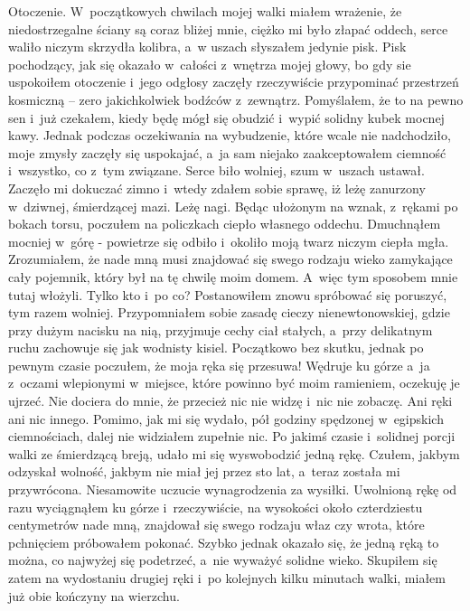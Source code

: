 Otoczenie. W~początkowych chwilach mojej walki miałem wrażenie, że niedostrzegalne ściany są coraz bliżej mnie, 
ciężko mi było złapać oddech, serce waliło niczym skrzydła kolibra, a~w uszach słyszałem jedynie pisk. Pisk 
pochodzący, jak się okazało w~całości z~wnętrza mojej głowy, bo gdy sie uspokoiłem otoczenie i~jego odgłosy zaczęły 
rzeczywiście przypominać przestrzeń kosmiczną -- zero jakichkolwiek bodźców z~zewnątrz. Pomyślałem, że to na pewno 
sen i~już czekałem, kiedy będę mógł się obudzić i~wypić solidny kubek mocnej kawy. Jednak podczas oczekiwania na 
wybudzenie, które wcale nie nadchodziło, moje zmysły zaczęły się uspokajać, a~ja sam niejako zaakceptowałem ciemność 
i~wszystko, co z~tym związane. Serce biło wolniej, szum w~uszach ustawał. Zaczęło mi dokuczać zimno i~wtedy zdałem 
sobie sprawę, iż leżę zanurzony w~dziwnej, śmierdzącej mazi. Leżę nagi. Będąc ułożonym na wznak, z~rękami po bokach 
torsu, poczułem na policzkach ciepło własnego oddechu. Dmuchnąłem mocniej w~górę - powietrze się odbiło i~okoliło 
moją twarz niczym ciepła mgła. Zrozumiałem, że nade mną musi znajdować się swego rodzaju wieko zamykające cały 
pojemnik, który był na tę chwilę moim domem. A~więc tym sposobem mnie tutaj włożyli. Tylko kto i~po co? 
Postanowiłem znowu spróbować się poruszyć, tym razem wolniej. Przypomniałem sobie zasadę cieczy nienewtonowskiej, 
gdzie przy dużym nacisku na nią, przyjmuje cechy ciał stałych, a~przy delikatnym ruchu zachowuje się jak wodnisty 
kisiel. Początkowo bez skutku, jednak po pewnym czasie poczułem, że moja ręka się przesuwa! Wędruje ku górze a~ja 
z~oczami wlepionymi w~miejsce, które powinno być moim ramieniem, oczekuję je ujrzeć. Nie dociera do mnie, że przecież 
nic nie widzę i~nic nie zobaczę. Ani ręki ani nic innego. Pomimo, jak mi się wydało, pół godziny spędzonej 
w~egipskich ciemnościach, dalej nie widziałem zupełnie nic. Po jakimś czasie i~solidnej porcji walki ze śmierdzącą 
breją, udało mi się wyswobodzić jedną rękę. Czułem, jakbym odzyskał wolność, jakbym nie miał jej przez sto lat, 
a~teraz została mi przywrócona. Niesamowite uczucie wynagrodzenia za wysiłki. Uwolnioną rękę od razu wyciągnąłem ku 
górze i~rzeczywiście, na wysokości około czterdziestu centymetrów nade mną, znajdował się swego rodzaju właz czy 
wrota, które pchnięciem próbowałem pokonać. Szybko jednak okazało się, że jedną ręką to można, co najwyżej się 
podetrzeć, a~nie wyważyć solidne wieko. Skupiłem się zatem na wydostaniu drugiej ręki i~po kolejnych kilku minutach 
walki, miałem już obie kończyny na wierzchu. 

